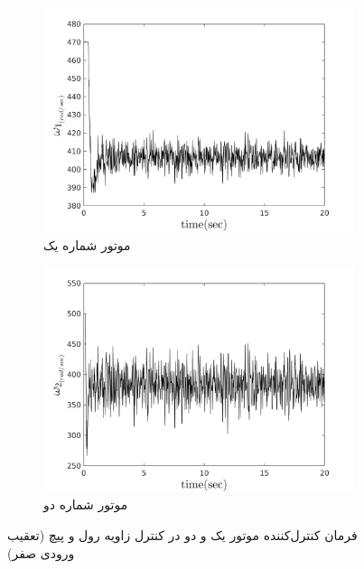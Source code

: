 \begin{figure}
	[width=12cm]
	\centering
	\begin{subfigure}
		\centering
		\includegraphics[width=12cm]{../Figures/MIL/LQIDG/Roll_Pitch/lqidg_roll_pitch_Omega_1.png}
		\caption{موتور شماره یک}
	\end{subfigure}
	\begin{subfigure}
	\centering
	\includegraphics[width=12cm]{../Figures/MIL/LQIDG/Roll_Pitch/lqidg_roll_pitch_Omega_2.png}
	\caption{موتور شماره دو}
\end{subfigure}
	\caption{‫‪فرمان کنترل‌کننده موتور یک و دو در کنترل زاویه رول و پیچ (تعقیب ورودی صفر)}
\end{figure}


